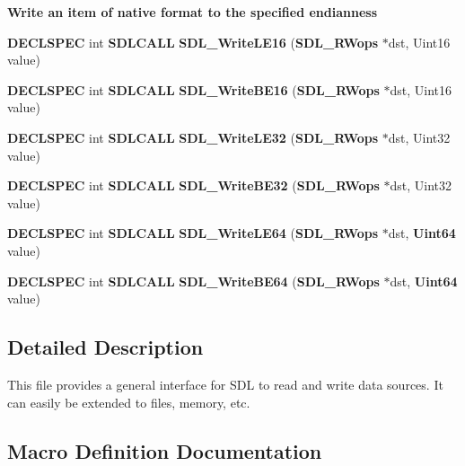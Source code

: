 \begin{Indent}{\bf Write an item of native format to the specified endianness}\par
\begin{DoxyCompactItemize}
\item 
{\bf D\+E\+C\+L\+S\+P\+E\+C} int {\bf S\+D\+L\+C\+A\+L\+L} {\bfseries S\+D\+L\+\_\+\+Write\+L\+E16} ({\bf S\+D\+L\+\_\+\+R\+Wops} $\ast$dst, Uint16 value)\label{_s_d_l__rwops_8h_ae41bf3c051622db876fca539ce537b64}

\item 
{\bf D\+E\+C\+L\+S\+P\+E\+C} int {\bf S\+D\+L\+C\+A\+L\+L} {\bfseries S\+D\+L\+\_\+\+Write\+B\+E16} ({\bf S\+D\+L\+\_\+\+R\+Wops} $\ast$dst, Uint16 value)\label{_s_d_l__rwops_8h_afa7bd46242e199ee160f0fb6b1fa1399}

\item 
{\bf D\+E\+C\+L\+S\+P\+E\+C} int {\bf S\+D\+L\+C\+A\+L\+L} {\bfseries S\+D\+L\+\_\+\+Write\+L\+E32} ({\bf S\+D\+L\+\_\+\+R\+Wops} $\ast$dst, Uint32 value)\label{_s_d_l__rwops_8h_a741d0075b11254ae1495c6c3a97b6554}

\item 
{\bf D\+E\+C\+L\+S\+P\+E\+C} int {\bf S\+D\+L\+C\+A\+L\+L} {\bfseries S\+D\+L\+\_\+\+Write\+B\+E32} ({\bf S\+D\+L\+\_\+\+R\+Wops} $\ast$dst, Uint32 value)\label{_s_d_l__rwops_8h_a0e351f1b6868c34e14303830ae2c4820}

\item 
{\bf D\+E\+C\+L\+S\+P\+E\+C} int {\bf S\+D\+L\+C\+A\+L\+L} {\bfseries S\+D\+L\+\_\+\+Write\+L\+E64} ({\bf S\+D\+L\+\_\+\+R\+Wops} $\ast$dst, {\bf Uint64} value)\label{_s_d_l__rwops_8h_a593365137c6e8e9b2e67261da96647cd}

\item 
{\bf D\+E\+C\+L\+S\+P\+E\+C} int {\bf S\+D\+L\+C\+A\+L\+L} {\bfseries S\+D\+L\+\_\+\+Write\+B\+E64} ({\bf S\+D\+L\+\_\+\+R\+Wops} $\ast$dst, {\bf Uint64} value)\label{_s_d_l__rwops_8h_ac0b7a70e6b4ceaba9017e24c3a3f31c9}

\end{DoxyCompactItemize}
\end{Indent}


\subsection{Detailed Description}
This file provides a general interface for S\+D\+L to read and write data sources. It can easily be extended to files, memory, etc. 

\subsection{Macro Definition Documentation}
